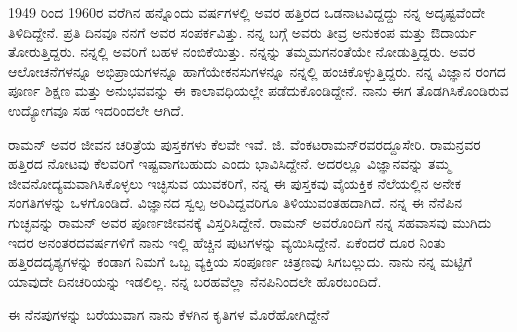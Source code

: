 \medskip

1949 ರಿಂದ 1960ರ ವರೆಗಿನ ಹನ್ನೊಂದು ವರ್ಷಗಳಲ್ಲಿ ಅವರ ಹತ್ತಿರದ ಒಡನಾಟವಿದ್ದದ್ದು ನನ್ನ ಅದೃಷ್ಟವೆಂದೇ ತಿಳಿದಿದ್ದೇನೆ. ಪ್ರತಿ ದಿನವೂ ನನಗೆ ಅವರ ಸಂಪರ್ಕವಿತ್ತು. ನನ್ನ ಬಗ್ಗೆ ಅವರು ತೀವ್ರ ಅನುಕಂಪ ಮತ್ತು ಔದಾರ್ಯ ತೋರುತ್ತಿದ್ದರು. ನನ್ನಲ್ಲಿ ಅವರಿಗೆ ಬಹಳ ನಂಬಿಕೆಯಿತ್ತು. ನನ್ನನ್ನು ತಮ್ಮ\break ಮಗನಂತೆಯೇ ನೋಡುತ್ತಿದ್ದರು. ಅವರ ಆಲೋಚನೆಗಳನ್ನೂ ಅಭಿಪ್ರಾಯಗಳನ್ನೂ ಹಾಗೆಯೇ\break ಕನಸುಗಳನ್ನೂ ನನ್ನಲ್ಲಿ ಹಂಚಿಕೊಳ್ಳುತ್ತಿದ್ದರು. ನನ್ನ ವಿಜ್ಞಾನ ರಂಗದ ಪೂರ್ಣ ಶಿಕ್ಷಣ ಮತ್ತು ಅನುಭವವನ್ನು ಈ ಕಾಲಾವಧಿಯಲ್ಲೇ ಪಡೆದುಕೊಂಡಿದ್ದೇನೆ. ನಾನು ಈಗ ತೊಡಗಿಸಿಕೊಂಡಿರುವ ಉದ್ಯೋಗವೂ ಸಹ ಇದರಿಂದಲೇ ಆಗಿದೆ. 

\medskip

ರಾಮನ್ ಅವರ ಜೀವನ ಚರಿತ್ರೆಯ ಪುಸ್ತಕಗಳು ಕೆಲವೇ ಇವೆ. \enginline{-}ಜಿ. ವೆಂಕಟರಾಮನ್‌‌ರವರದ್ದೂ\break ಸೇರಿ. ರಾಮನ್ರವರ ಹತ್ತಿರದ ನೋಟವು ಕೆಲವರಿಗೆ ಇಷ್ಟವಾಗಬಹುದು ಎಂದು ಭಾವಿಸಿದ್ದೇನೆ. ಅದರಲ್ಲೂ ವಿಜ್ಞಾನವನ್ನು ತಮ್ಮ ಜೀವನೋದ್ಯಮವಾಗಿಸಿಕೊಳ್ಳಲು ಇಚ್ಛಿಸುವ ಯುವಕರಿಗೆ, ನನ್ನ ಈ ಪುಸ್ತಕವು ವೈಯಕ್ತಿಕ ನೆಲೆಯಲ್ಲಿನ ಅನೇಕ ಸಂಗತಿಗಳನ್ನು ಒಳಗೊಂಡಿದೆ. ವಿಜ್ಞಾನದ ಸ್ವಲ್ಪ ಅರಿವಿದ್ದ\break ವರಿಗೂ ತಿಳಿಯುವಂತಹದಾಗಿದೆ. ನನ್ನ ಈ ನೆನೆಪಿನ ಗುಚ್ಛವನ್ನು ರಾಮನ್ ಅವರ ಪೂರ್ಣಜೀವನಕ್ಕೆ ವಿಸ್ತರಿಸಿದ್ದೇನೆ. ರಾಮನ್ ಅವರೊಂದಿಗೆ ನನ್ನ ಸಹವಾಸವು ಮುಗಿದು ಇದರ ಅನಂತರದ\break ವರ್ಷಗಳಿಗೆ ನಾನು ಇಲ್ಲಿ ಹೆಚ್ಚಿನ ಪುಟಗಳನ್ನು ವ್ಯಯಿಸಿದ್ದೇನೆ. ಏಕೆಂದರೆ ದೂರ ನಿಂತು ಹತ್ತಿರದ\break ದೃಶ್ಯಗಳನ್ನು ಕಂಡಾಗ ನಿಮಗೆ ಒಬ್ಬ ವ್ಯಕ್ತಿಯ ಸಂಪೂರ್ಣ ಚಿತ್ರಣವು ಸಿಗಬಲ್ಲುದು. ನಾನು ನನ್ನ ಮಟ್ಟಿಗೆ ಯಾವುದೇ ದಿನಚರಿಯನ್ನು ಇಡಲಿಲ್ಲ. ನನ್ನ ಬರಹವೆಲ್ಲಾ ನೆನಪಿನಿಂದಲೇ ಹೊರಬಂದಿದೆ.

\newpage	

ಈ ನೆನಪುಗಳನ್ನು ಬರೆಯುವಾಗ ನಾನು ಕೆಳಗಿನ ಕೃತಿಗಳ ಮೊರೆಹೋಗಿದ್ದೇನೆ\enginline{-}
\medskip

